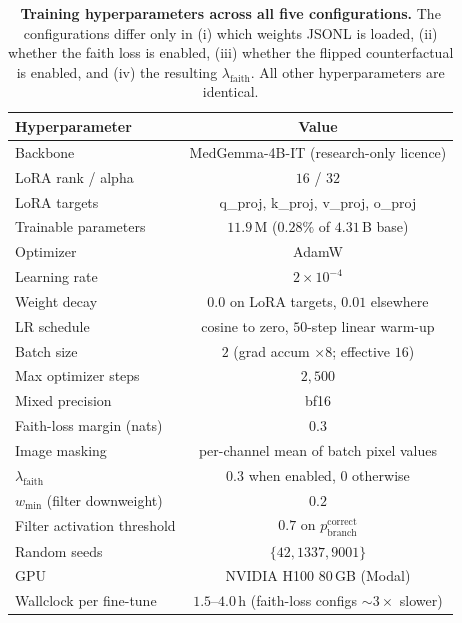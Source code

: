 \documentclass{article}
\begin{document}
\begin{table}[t]
\centering
\small
\caption{\textbf{Training hyperparameters across all five
configurations.} The configurations differ only in (i) which weights
JSONL is loaded, (ii) whether the faith loss is enabled, (iii) whether
the flipped counterfactual is enabled, and (iv) the resulting
$\lambda_{\mathrm{faith}}$. All other hyperparameters are identical.}
\label{tab:hyper}
\begin{tabular}{lc}
\toprule
\textbf{Hyperparameter} & \textbf{Value}\\
\midrule
Backbone                          & MedGemma-4B-IT (research-only licence)\\
LoRA rank / alpha                 & $16$ / $32$\\
LoRA targets                      & q\_proj, k\_proj, v\_proj, o\_proj\\
Trainable parameters              & $11.9$\,M ($0.28\%$ of $4.31$\,B base)\\
Optimizer                         & AdamW\\
Learning rate                     & $2\times 10^{-4}$\\
Weight decay                      & $0.0$ on LoRA targets, $0.01$ elsewhere\\
LR schedule                       & cosine to zero, $50$-step linear warm-up\\
Batch size                        & $2$ (grad accum $\times 8$; effective $16$)\\
Max optimizer steps               & $2{,}500$\\
Mixed precision                   & bf16\\
Faith-loss margin (nats)          & $0.3$\\
Image masking                     & per-channel mean of batch pixel values\\
$\lambda_{\mathrm{faith}}$        & $0.3$ when enabled, $0$ otherwise\\
$w_{\min}$ (filter downweight)    & $0.2$\\
Filter activation threshold       & $0.7$ on $p_{\text{branch}}^{\text{correct}}$\\
Random seeds                      & $\{42, 1337, 9001\}$\\
GPU                               & NVIDIA H100 80\,GB (Modal)\\
Wallclock per fine-tune           & $1.5$--$4.0$\,h (faith-loss configs $\sim 3\times$ slower)\\
\bottomrule
\end{tabular}
\end{table}
\end{document}
